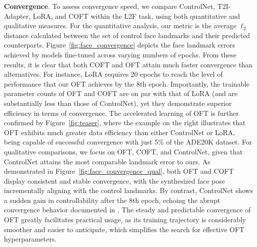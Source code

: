 {\textbf{Convergence}. To assess convergence speed, we compare ControlNet, T2I-Adapter, LoRA, and COFT within the L2F task, using both quantitative and qualitative measures. For the quantitative analysis, our metric is the average $\ell_2$ distance calculated between the set of control face landmarks and their predicted counterparts. Figure~\ref{fig:face_convergence} depicts the face landmark errors achieved by models fine-tuned across varying numbers of epochs. From these results, it is clear that both COFT and OFT attain much faster convergence than alternatives. For instance, LoRA requires 20 epochs to reach the level of performance that our OFT achieves by the 8th epoch. Importantly, the trainable parameter counts of OFT and COFT are on par with that of LoRA (and are substantially less than those of ControlNet), yet they demonstrate superior efficiency in terms of convergence. The accelerated learning of OFT is further confirmed by Figure~\ref{fig:teaser}, where the example on the right illustrates that OFT exhibits much greater data efficiency than either ControlNet or LoRA, being capable of successful convergence with just 5\% of the ADE20K dataset. For qualitative comparisons, we focus on OFT, COFT, and ControlNet, given that ControlNet attains the most comparable landmark error to ours. As demonstrated in Figure~\ref{fig:face_convergence_qual}, both OFT and COFT display consistent and stable convergence, with the synthesized face pose incrementally aligning with the control landmarks. By contrast, ControlNet shows a sudden gain in controllability after the 8th epoch, echoing the abrupt convergence behavior documented in \cite{zhang2023adding}. The steady and predictable convergence of OFT greatly facilitates practical usage, as its training trajectory is considerably smoother and easier to anticipate, which simplifies the search for effective OFT hyperparameters.

}
